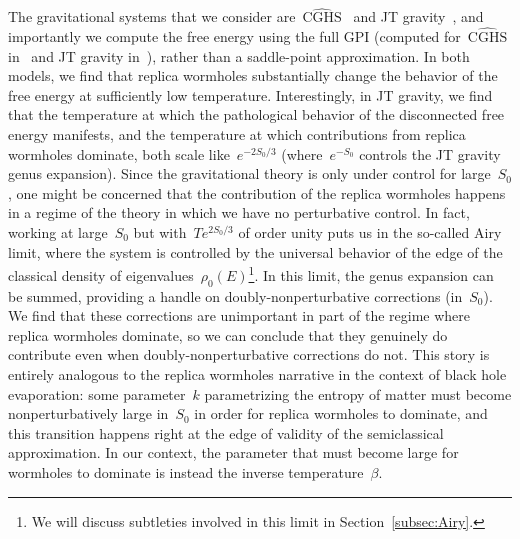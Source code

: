 \documentclass[12pt]{article}
\begin{document}
The gravitational systems that we consider are~$\widehat{\mathrm{CGHS}}$~\cite{CGHS, CGHShat} and JT gravity~\cite{Tei83, Jackiw}, and importantly we compute the free energy using the full GPI (computed for~$\widehat{\mathrm{CGHS}}$ in~\cite{GodMar20} and JT gravity in~\cite{SSS}), rather than a saddle-point approximation. In both models, we find that replica wormholes substantially change the behavior of the free energy at sufficiently low temperature.  Interestingly, in JT gravity, we find that the temperature at which the pathological behavior of the disconnected free energy manifests, and the temperature at which contributions from replica wormholes dominate, both scale like~$e^{-2S_0/3}$ (where~$e^{-S_0}$ controls the JT gravity genus expansion).  Since the gravitational theory is only under control for large~$S_0$, one might be concerned that the contribution of the replica wormholes happens in a regime of the theory in which we have no perturbative control.  In fact, working at large~$S_0$ but with~$T e^{2S_0/3}$ of order unity puts us in the so-called Airy limit, where the system is controlled by the universal behavior of the edge of the classical density of eigenvalues~$\rho_0(E)$\footnote{We will discuss subtleties involved in this limit in Section~\ref{subsec:Airy}.}.  In this limit, the genus expansion can be summed, providing a handle on doubly-nonperturbative corrections (in~$S_0$).  We find that these corrections are unimportant in part of the regime where replica wormholes dominate, so we can conclude that they genuinely do contribute even when doubly-nonperturbative corrections do not.  This story is entirely analogous to the replica wormholes narrative in the context of black hole evaporation: some parameter~$k$ parametrizing the entropy of matter must become nonperturbatively large in~$S_0$ in order for replica wormholes to dominate, and this transition happens right at the edge of validity of the semiclassical approximation.  In our context, the parameter that must become large for wormholes to dominate is instead the inverse temperature~$\beta$.
\end{document}

